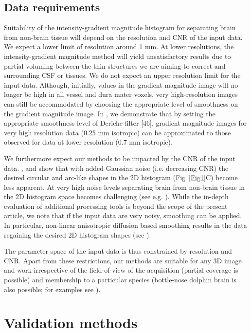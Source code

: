 \subsection{Data requirements}
Suitability of the intensity-gradient magnitude histogram for separating brain from non-brain tissue will depend on the resolution and CNR of the input data. We expect a lower limit of resolution around 1 mm. At lower resolutions, the intensity-gradient magnitude method will yield unsatisfactory results due to partial voluming between the thin structures we are aiming to correct and surrounding CSF or tissues. We do not expect an upper resolution limit for the input data. Although, initially, values in the gradient magnitude image will no longer be high in all vessel and dura mater voxels, very high-resolution images can still be accommodated by choosing the appropriate level of smoothness on the gradient magnitude image. In , we demonstrate that by setting the appropriate smoothness level of Deriche filter [46], gradient magnitude images for very high resolution data (0.25 mm isotropic) \cite{250micron_data, Lusebrink2017} can be approximated to those observed for data at lower resolution (0.7 mm isotropic).

We furthermore expect our methods to be impacted by the CNR of the input data. ,  and  show that with added Gaussian noise (i.e. decreasing CNR) the desired circular and arc-like shapes in the 2D histogram (Fig~\ref{Fig1}C) become less apparent. At very high noise levels separating brain from non-brain tissue in the 2D histogram space becomes challenging (see e.g. ). While the in-depth evaluation of additional processing tools is beyond the scope of the present article, we note that if the input data are very noisy, smoothing can be applied. In particular, non-linear anisotropic diffusion based smoothing \cite{Weickert1998, Mirebeau2015} results in the data regaining the desired 2D histogram shapes (see ).

The parameter space of the input data is thus constrained by resolution and CNR. Apart from these restrictions, our methods are suitable for any 3D image and work irrespective of the field-of-view of the acquisition (partial coverage is possible) and membership to a particular species (bottle-nose dolphin brain is also possible; for examples see ).

\section{Validation methods} \label{ValidationMethods}
